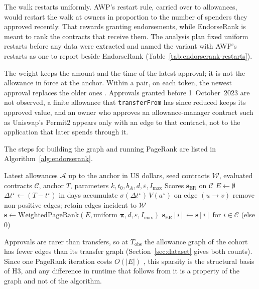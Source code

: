 The walk restarts uniformly. AWP's restart rule, carried over to allowances, would restart the walk at owners in proportion to the number of spenders they approved recently. That rewards granting endorsements, while EndorseRank is meant to rank the contracts that receive them. The analysis plan fixed uniform restarts before any data were extracted and named the variant with AWP's restarts as one to report beside EndorseRank (Table~\ref{tab:endorserank-restarts}).

The weight keeps the amount and the time of the latest approval; it is not the allowance in force at the anchor. Within a pair, on each token, the newest approval replaces the older ones \parencite{vogelsteller2015erc20}. Approvals granted before 1~October~2023 are not observed, a finite allowance that \texttt{transferFrom} has since reduced keeps its approved value, and an owner who approves an allowance-manager contract such as Uniswap's Permit2 appears only with an edge to that contract, not to the application that later spends through it.

The steps for building the graph and running PageRank are listed in Algorithm~\ref{alg:endorserank}.

\begin{algorithm}[htbp]
\caption{EndorseRank graph construction and scoring}
\label{alg:endorserank}
\begin{algorithmic}[1]
\Require Latest allowances $\mathcal{A}$ up to the anchor in US dollars, seed contracts $\mathcal{W}$, evaluated contracts $\mathcal{C}$, anchor $T$, parameters $k,t_0,b_A,d,\varepsilon,I_{\max}$
\Ensure Scores $\mathbf{s}_{\mathrm{ER}}$ on $\mathcal{C}$
\State $E \gets \emptyset$
  \State $\Delta t^{\star} \gets (T-t^{\star})$ in days
  \State accumulate $\sigma(\Delta t^{\star})\,V(a^{\star})$ on edge $(u\to v)$ 
\EndFor
\State remove non-positive edges; retain edges incident to $\mathcal{W}$
\State $\mathbf{s} \gets \mathrm{WeightedPageRank}(E, \text{uniform }\boldsymbol{\pi}, d, \varepsilon, I_{\max})$ 
\State \Return $\mathbf{s}_{\mathrm{ER}}[i] \gets \mathbf{s}[i]$ for $i\in\mathcal{C}$ (else $0$)
\end{algorithmic}
\end{algorithm}

Approvals are rarer than transfers, so at $T_{\mathrm{obs}}$ the allowance graph of the cohort has fewer edges than its transfer graph (Section~\ref{sec:dataset} gives both counts). Since one PageRank iteration costs $O(|E|)$ \parencite{leskovec2020mining}, this sparsity is the structural basis of H3, and any difference in runtime that follows from it is a property of the graph and not of the algorithm.

